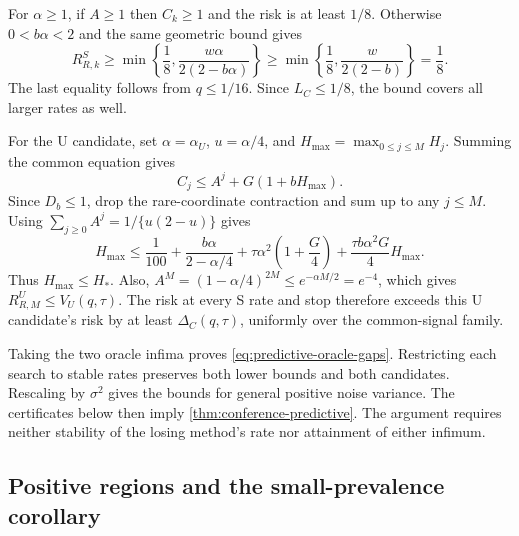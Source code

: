 \documentclass{alt2027}
\begin{document}
For $\alpha \geq 1$, if $A \geq 1$ then $C_k \geq 1$ and the risk is at least
$1/8$. Otherwise $0 < b\alpha < 2$ and the same geometric bound gives
\[
  R_{R,k}^S \geq \min\left\{ \frac18, \frac{w\alpha}{2(2 - b\alpha)} \right\}
            \geq \min\left\{ \frac18,\frac{w}{2(2 - b)} \right\}
            =    \frac18.
\]
The last equality follows from $q \leq 1/16$. Since $L_C \leq 1/8$, the bound
covers all larger rates as well.

For the U candidate, set $\alpha = \alpha_U$, $u = \alpha/4$, and
$H_{\max} = \max_{0 \leq j \leq M}H_j$. Summing the common equation gives
\[
  C_j \leq A^j + G(1 + bH_{\max}).
\]
Since $D_b \leq 1$, drop the rare-coordinate contraction and sum up to any
$j \leq M$. Using $\sum_{j \geq 0}A^j = 1/\{u(2 - u)\}$ gives
\[
  H_{\max} \leq \frac1{100}
                + \frac{b\alpha}{2 - \alpha/4}
                + \tau\alpha^2\left( 1 + \frac G4 \right)
                + \frac{\tau b\alpha^2G}{4}H_{\max}.
\]
Thus $H_{\max} \leq H_*$. Also,
$A^M = (1 - \alpha/4)^{2M} \leq e^{-\alpha M/2} = e^{-4}$, which gives
$R_{R,M}^U \leq V_U(q,\tau)$. The risk at every S rate and stop therefore
exceeds this U candidate's risk by at least $\Delta_C(q,\tau)$, uniformly over
the common-signal family.

Taking the two oracle infima proves \cref{eq:predictive-oracle-gaps}.
Restricting each search to stable rates preserves both lower bounds and both
candidates. Rescaling by $\sigma^2$ gives the bounds for general positive noise
variance. The certificates below then imply \cref{thm:conference-predictive}.
The argument requires neither stability of the losing method's rate nor
attainment of either infimum.

\subsection{Positive regions and the small-prevalence corollary}
\label{sec:predictive-certification}
\end{document}
